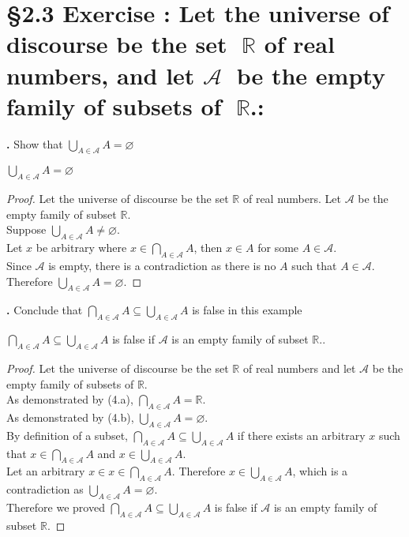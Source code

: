 \documentclass[a4paper,11pt]{article}
\begin{document}
\newpage
\section*{\S 2.3 Exercise : Let the universe of discourse be the set \(\mathbb{R}\) of real numbers, and let \(\mathscr{A}\) be the
empty family of subsets of \(\mathbb{R}\).:}
\noindent \setcounter{SubsectionCounter}{2}
\textbf{.}
Show that \(\bigcup\limits_{A\in\mathscr{A}}A=\varnothing\)
\begin{theorem2}
\(\bigcup\limits_{A\in\mathscr{A}}A=\varnothing\)
  \begin{proof}
    Let the universe of discourse be the set \(\mathbb{R}\) of real numbers. Let 
    \(\mathscr{A}\) be the empty family of subset \(\mathbb{R}\).\\
    Suppose \(\bigcup\limits_{A\in\mathscr{A}}A\neq\varnothing\).\\
    Let \(x\) be arbitrary where \(x \in \bigcap\limits_{A \in \mathscr{A}}A\), 
    then \(x \in A\) for some \(A \in \mathscr{A}\).\\
    Since \(\mathscr{A}\) is empty, there is a contradiction as there is no \(A\) such that \(A \in 
    \mathscr{A}\). Therefore \(\bigcup\limits_{A\in\mathscr{A}}A=\varnothing\).
  \end{proof}
\end{theorem2}

\noindent \setcounter{SubsectionCounter}{3}
\textbf{.}
Conclude that \(\bigcap\limits_{A\in\mathscr{A}}A \subseteq \bigcup\limits_{A\in\mathscr{A}}A\) 
is false in this example
\begin{theorem2}
\(\bigcap\limits_{A\in\mathscr{A}}A \subseteq \bigcup\limits_{A\in\mathscr{A}}A\) 
is false if \(\mathscr{A}\) is an empty family of subset \(\mathbb{R}\)..
   \begin{proof}
    Let the universe of discourse be the set \(\mathbb{R}\) of real numbers and let \(\mathscr{A}\) be the empty family of subsets of \(\mathbb{R}\).\\
    As demonstrated by {(4.a)}, \(\bigcap\limits_{A\in\mathscr{A}}A=\mathbb{R}\).\\
    As demonstrated by {(4.b)}, 
    \(\bigcup\limits_{A\in\mathscr{A}}A=\varnothing\).\\
    By definition of a subset, \(\bigcap\limits_{A\in\mathscr{A}}A \subseteq \bigcup\limits_{A\in\mathscr{A}}A\)  
    if there exists an arbitrary \(x\) such that \(x \in \bigcap\limits_{A\in\mathscr{A}}A\) 
    and \(x \in \bigcup\limits_{A\in\mathscr{A}}A\).\\
    Let an arbitrary \(x \in x \in \bigcap\limits_{A\in\mathscr{A}}A\). 
    Therefore \(x \in \bigcup\limits_{A\in\mathscr{A}}A\), which is a 
    contradiction as \(\bigcup\limits_{A\in\mathscr{A}}A=\varnothing\).\\
    Therefore we proved \(\bigcap\limits_{A\in\mathscr{A}}A \subseteq \bigcup\limits_{A\in\mathscr{A}}A\) 
is false if \(\mathscr{A}\) is an empty family of subset \(\mathbb{R}\).
  \end{proof}
\end{theorem2}
\end{document}
